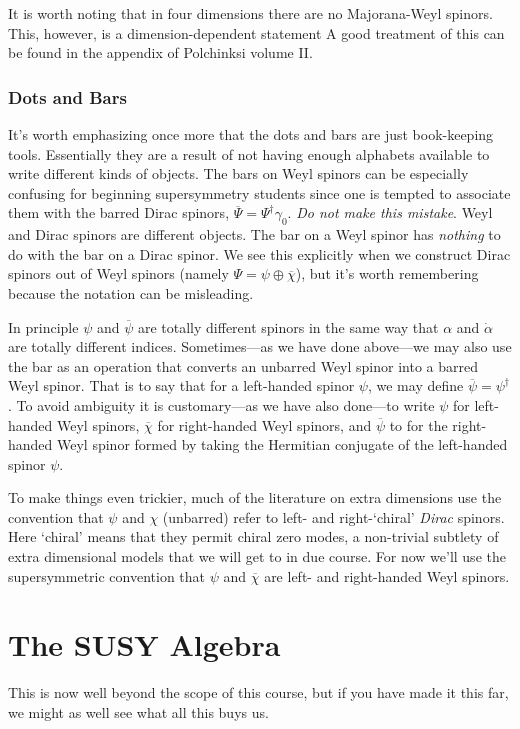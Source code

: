 \documentclass[12pt, oneside]{report}    %
\let\oldsection\section
\def\section{%
  \setcounter{sidenote}{1}%
  \oldsection
}
\begin{document}
It is worth noting that in four dimensions there are no Majorana-Weyl spinors. This, however, is a dimension-dependent statement A good treatment of this can be found in the appendix of Polchinksi volume II\autocite{Polchinski:1998rr}.


\subsubsection{Dots and Bars}

It's worth emphasizing once more that the dots and bars are just book-keeping tools. Essentially they are a result of not having enough alphabets available to write different kinds of objects. The bars on Weyl spinors can be especially confusing for beginning supersymmetry students since one is tempted to associate them with the barred Dirac spinors, $\overline\Psi = \Psi^\dagger \gamma_0$. \emph{Do not make this mistake}. Weyl and Dirac spinors are different objects. The bar on a Weyl spinor has \emph{nothing} to do with the bar on a Dirac spinor. We see this explicitly when we construct Dirac spinors out of Weyl spinors (namely $\Psi = \psi\oplus\overline\chi$), but it's worth remembering because the notation can be misleading. %

In principle $\psi$ and $\overline\psi$ are totally different spinors in the same way that $\alpha$ and $\dot\alpha$ are totally different indices. Sometimes---as we have done above---we may also use the bar as an operation that converts an unbarred Weyl spinor into a barred Weyl spinor. That is to say that for a left-handed spinor $\psi$, we may define $\overline\psi=\psi^\dag$. To avoid ambiguity it is customary---as we have also done---to write $\psi$ for left-handed Weyl spinors, $\overline\chi$ for right-handed Weyl spinors, and $\overline\psi$ to for the right-handed Weyl spinor formed by taking the Hermitian conjugate of the left-handed spinor $\psi$.

To make things even trickier, much of the literature on extra dimensions use the convention that $\psi$ and $\chi$ (unbarred) refer to left- and right-`chiral' \textit{Dirac} spinors. Here `chiral' means that they permit chiral zero modes, a non-trivial subtlety of extra dimensional models that we will get to in due course. For now we'll use the supersymmetric convention that $\psi$ and $\overline\chi$ are left- and right-handed Weyl spinors.



\section{The SUSY Algebra}
\label{chap:SUSYalg}
This is now well beyond the scope of this course, but if you have made it this far, we might as well see what all this buys us.
\end{document}
